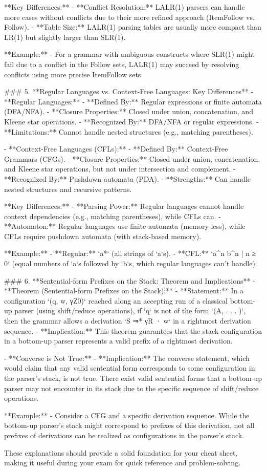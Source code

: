 **Key Differences:**
- **Conflict Resolution:** LALR(1) parsers can handle more cases without conflicts due to their more refined approach (ItemFollow vs. Follow).
- **Table Size:** LALR(1) parsing tables are usually more compact than LR(1) but slightly larger than SLR(1).

**Example:**
- For a grammar with ambiguous constructs where SLR(1) might fail due to a conflict in the Follow sets, LALR(1) may succeed by resolving conflicts using more precise ItemFollow sets.


### 5. **Regular Languages vs. Context-Free Languages: Key Differences**
- **Regular Languages:**
  - **Defined By:** Regular expressions or finite automata (DFA/NFA).
  - **Closure Properties:** Closed under union, concatenation, and Kleene star operations.
  - **Recognized By:** DFA/NFA or regular expressions.
  - **Limitations:** Cannot handle nested structures (e.g., matching parentheses).

- **Context-Free Languages (CFLs):**
  - **Defined By:** Context-Free Grammars (CFGs).
  - **Closure Properties:** Closed under union, concatenation, and Kleene star operations, but not under intersection and complement.
  - **Recognized By:** Pushdown automata (PDA).
  - **Strengths:** Can handle nested structures and recursive patterns.

**Key Differences:**
- **Parsing Power:** Regular languages cannot handle context dependencies (e.g., matching parentheses), while CFLs can.
- **Automaton:** Regular languages use finite automata (memory-less), while CFLs require pushdown automata (with stack-based memory).

**Example:**
- **Regular:** `a*` (all strings of `a`s).
- **CFL:** `{a^n b^n | n ≥ 0}` (equal numbers of `a`s followed by `b`s, which regular languages can't handle).


### 6. **Sentential-form Prefixes on the Stack: Theorem and Implications**
- **Theorem (Sentential-form Prefixes on the Stack):**
  - **Statement:** In a configuration `(q, w, γZ0)` reached along an accepting run of a classical bottom-up parser (using shift/reduce operations), if `q` is not of the form `(A, . . . )`, then the grammar allows a derivation `S ⇒* γR · w` in a rightmost derivation sequence.
  - **Implication:** This theorem guarantees that the stack configuration in a bottom-up parser represents a valid prefix of a rightmost derivation.

- **Converse is Not True:**
  - **Implication:** The converse statement, which would claim that any valid sentential form corresponds to some configuration in the parser's stack, is not true. There exist valid sentential forms that a bottom-up parser may not encounter in its stack due to the specific sequence of shift/reduce operations.

**Example:**
- Consider a CFG and a specific derivation sequence. While the bottom-up parser’s stack might correspond to prefixes of this derivation, not all prefixes of derivations can be realized as configurations in the parser’s stack.


These explanations should provide a solid foundation for your cheat sheet, making it useful during your exam for quick reference and problem-solving.
